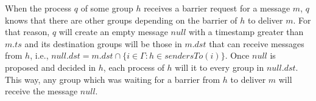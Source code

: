 \documentclass[times, 10pt]{article}
\begin{document}
When the process $q$ of some group $h$ receives a barrier request for a message $m$, %
$q$ knows that there are other groups depending on the barrier of $h$ to deliver $m$. For that reason, $q$ will create an empty message $null$ with a timestamp greater than $m.ts$ and its destination groups will be those in $m.dst$ that can receive messages from $h$, i.e., $null.dst = m.dst \cap \{i \in \Gamma: h \in sendersTo(i)\}$. %
Once $null$ is proposed and decided in $h$, each process of $h$ will \rmcast{} it to every group in $null.dst$. This way, any group which was waiting for a barrier from $h$ to deliver $m$ will receive the message $null$.%
% 
% 
% 
% 
\end{document}
